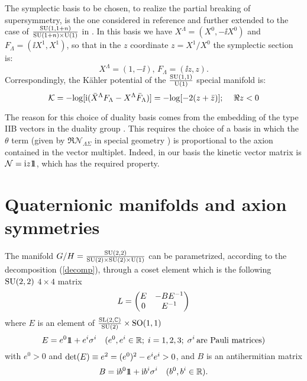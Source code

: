 \documentclass[a4paper,12pt]{article}
\begin{document}
The symplectic basis to be chosen, to realize the partial breaking of supersymmetry, is the one considered in reference \cite{fgp}
and further extended to the case of $\frac{\mathrm{SU}(1,1+n)}{\mathrm{SU}(1+n) \times \mathrm{U}(1)}$ in \cite{dflv}.
In this basis we have
$X^\Lambda = (X^0 , -\ii X^0 )$ and $F_\Lambda = (\ii X^1 , X^1)$, so that in the $z$ coordinate $z=X^1/X^0$ the symplectic section is:
\begin{equation}
X^\Lambda =(1,-\ii) , \, F_\Lambda =(\ii z , z).
\label{basis}
\end{equation}
Correspondingly, the K\"ahler potential of the $\frac{\mathrm{SU}(1,1)}{\mathrm{U}(1)}$ special manifold is:
\begin{equation}
{\mathcal K} = - {\rm log}[\mathrm{i}(\bar X^\Lambda F_\Lambda - X^\Lambda \bar F_\Lambda )]= - {\rm log}[-2(z+\bar z)] ; \quad \, \Re z < 0
\end{equation}   

The reason for this choice of duality basis comes from the embedding of the type IIB vectors in the duality group \cite{fp1,kst,dfv}.
This requires the choice of a basis in which the $\theta$ term (given by $\Re {\mathcal N}_{\Lambda\Sigma}$ in special geometry
\cite{abcdffm}) is proportional to the axion contained in the vector multiplet. Indeed, in our basis the kinetic vector matrix is
${\mathcal N} = \mathrm{i} z \relax{\rm 1\kern-.35em 1}$, which has the required property.




 \section{Quaternionic manifolds and axion symmetries}

The manifold $G/H =\frac{\mathrm{SU}(2,2)}{\mathrm{SU}(2)\times \mathrm{SU}(2)\times \mathrm{U}(1)}$ can be parametrized, according to the decomposition
(\ref{decomp}), through a coset element which is
the following $\mathrm{SU}(2,2)$ $4\times 4$ matrix
\begin{equation}
L = \begin{pmatrix}E & -BE^{-1} \cr 0 & E^{-1}\cr\end{pmatrix}
\end{equation}
where $E$ is an element of $\frac{\mathrm{SL}(2,\mathbb{C})}{\mathrm{SU}(2)}\times \mathrm{SO}(1,1)$ 
\begin{equation}
E = e^0 \relax{\rm 1\kern-.35em 1} + e^i \sigma^i \quad  (e^0, e^i \in \mathbb{R};\; i =1,2,3;\; \sigma^i\, \mbox{are Pauli matrices})
\end{equation} 
with $e^0 >0$ and ${\rm det}(E) \equiv e^2 = (e^0)^2-e^ie^i >0$,
and $B$ is an antihermitian matrix
\begin{equation}
B = \mathrm{i} b^0 \relax{\rm 1\kern-.35em 1} + \mathrm{i} b^i \sigma^i \quad (b^0, b^i \in \mathbb{R}).
\end{equation}
\end{document}
